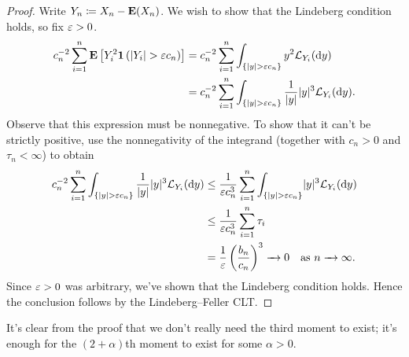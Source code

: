 \documentclass[11pt,letterpaper,reqno,oneside]{article}
\begin{document}
\begin{proof}
	Write $Y_n \coloneqq X_n-\mathbf{E}(X_n)$. We wish to show that the Lindeberg condition holds, so fix $\varepsilon>0$.
	\begin{align*}
		c_n^{-2}
		\sum_{i=1}^n 
		\mathbf{E}\left[
		Y_i^2
		\boldsymbol{1}\left( \lvert Y_i\rvert > \varepsilon c_n \right)
		\right]
		={}&
		c_n^{-2}
		\sum_{i=1}^n 
		\int_{\{ \lvert y\rvert > \varepsilon c_n \}}
		y^2 
		\mathcal{L}_{Y_i}(\mathrm{d} y)
		\\
		={}&
		c_n^{-2}
		\sum_{i=1}^n 
		\int_{\{ \lvert y\rvert > \varepsilon c_n \}}
		\frac{1}{\lvert y\rvert} \lvert y\rvert^3 
		\mathcal{L}_{Y_i}(\mathrm{d} y) .
	\end{align*}
	Observe that this expression must be nonnegative. To show that it can't be strictly positive, use the nonnegativity of the integrand (together with $c_n>0$ and $\tau_n<\infty$) to obtain
	\begin{align*}
		c_n^{-2}
		\sum_{i=1}^n 
		\int_{\{ \lvert y\rvert > \varepsilon c_n \}}
		\frac{1}{\lvert y\rvert} \lvert y\rvert^3 
		\mathcal{L}_{Y_i}(\mathrm{d} y) 
		\leq{}&
		\frac{1}{\varepsilon c_n^3} 
		\sum_{i=1}^n 
		\int_{\{ \lvert y\rvert > \varepsilon c_n \}}
		\lvert y\rvert^3 
		\mathcal{L}_{Y_i}(\mathrm{d} y) 
		\\
		\leq{}&
		\frac{1}{\varepsilon c_n^3} 
		\sum_{i=1}^n 
		\tau_i
		\\
		={}&
		\frac{1}{\varepsilon} 
		\left(\frac{b_n}{c_n}\right)^3
		\xrightarrow{\;\;\;} 0 
		\quad\text{as $n\xrightarrow{\;\;\;}\infty$} .
	\end{align*}	
	Since $\varepsilon>0$ was arbitrary, we've shown that the Lindeberg condition holds. Hence the conclusion follows by the Lindeberg--Feller CLT.
\end{proof}

\begin{remark}
	It's clear from the proof that we don't really need the third moment to exist; it's enough for the $(2+\alpha)$th moment to exist for some $\alpha>0$.
\end{remark}
\end{document}
